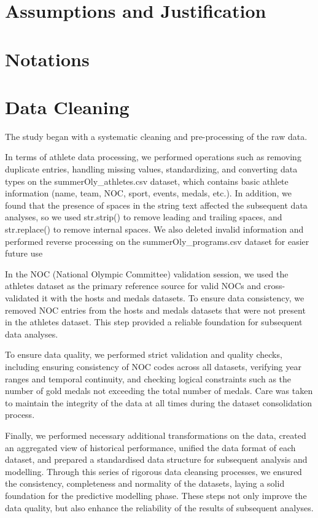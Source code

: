 \documentclass{mcmthesis}
\begin{document}
\section{Assumptions and Justification}

\section{Notations}

\section{Data Cleaning}
The study began with a systematic cleaning and pre-processing of the raw data.

In terms of athlete data processing, we performed operations such as removing duplicate entries, handling missing values, standardizing, and converting data types on the summerOly\_athletes.csv dataset, which contains basic athlete information (name, team, NOC, sport, events, medals, etc.). In addition, we found that the presence of spaces in the string text affected the subsequent data analyses, so we used str.strip() to remove leading and trailing spaces, and str.replace() to remove internal spaces. We also deleted invalid information and performed reverse processing on the summerOly\_programs.csv dataset for easier future use

In the NOC (National Olympic Committee) validation session, we used the athletes dataset as the primary reference source for valid NOCs and cross-validated it with the hosts and medals datasets. To ensure data consistency, we removed NOC entries from the hosts and medals datasets that were not present in the athletes dataset. This step provided a reliable foundation for subsequent data analyses.

To ensure data quality, we performed strict validation and quality checks, including ensuring consistency of NOC codes across all datasets, verifying year ranges and temporal continuity, and checking logical constraints such as the number of gold medals not exceeding the total number of medals. Care was taken to maintain the integrity of the data at all times during the dataset consolidation process.

Finally, we performed necessary additional transformations on the data, created an aggregated view of historical performance, unified the data format of each dataset, and prepared a standardised data structure for subsequent analysis and modelling. Through this series of rigorous data cleansing processes, we ensured the consistency, completeness and normality of the datasets, laying a solid foundation for the predictive modelling phase. These steps not only improve the data quality, but also enhance the reliability of the results of subsequent analyses.
\end{document}
